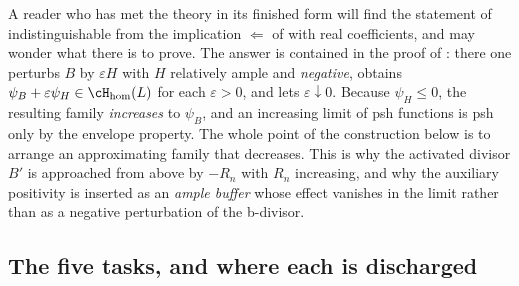 \begin{remark}
\label{rem:ch38-firewall-not-vacuous}
A reader who has met the theory in its finished form will find the
statement of  indistinguishable from
the implication $\Leftarrow$ of 
with real coefficients, and may wonder what there is to prove.  The answer
is contained in the proof of : there
one perturbs $B$ by $\varepsilon H$ with $H$ relatively ample and
\emph{negative}, obtains $\psi_B+\varepsilon\psi_H\in\cH_{\mathrm{hom}}(L)$
for each $\varepsilon>0$, and lets $\varepsilon\downarrow0$.  Because
$\psi_H\leq0$, the resulting family \emph{increases} to $\psi_B$, and
an increasing limit of psh functions is psh only by the envelope property.
The whole point of the construction below is to arrange an approximating
family that decreases.  This is why the activated divisor $B'$ is approached from
above by $-R_n$ with $R_n$ increasing, and why the auxiliary positivity
is inserted as an \emph{ample buffer} whose effect vanishes in the limit
rather than as a negative perturbation of the b-divisor.
\end{remark}

\subsection{The five tasks, and where each is discharged}
\label{sec:ch38-payoff}

